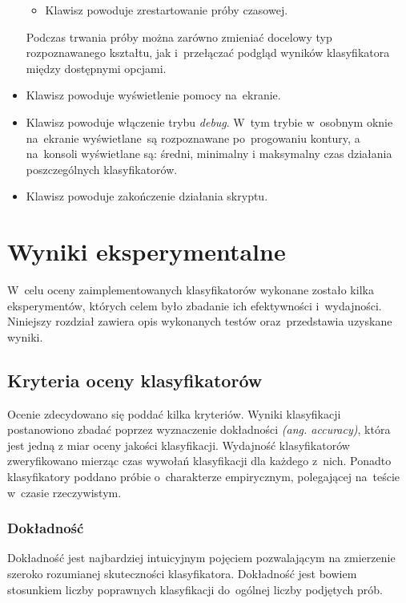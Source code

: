 \documentclass[11pt,a4paper]{article}
\begin{document}
\begin{itemize}
\begin{itemize}
        \item Klawisz  powoduje zrestartowanie próby czasowej.
    \end{itemize}
    Podczas trwania próby można zarówno zmieniać docelowy typ rozpoznawanego kształtu, jak i~przełączać podgląd wyników klasyfikatora między dostępnymi opcjami.
    \item Klawisz  powoduje wyświetlenie pomocy na~ekranie.
    \item Klawisz  powoduje włączenie trybu \emph{debug}.
    W~tym trybie w~osobnym oknie na~ekranie wyświetlane~są rozpoznawane po~progowaniu kontury, a na~konsoli wyświetlane są: średni, minimalny i maksymalny czas działania poszczególnych klasyfikatorów.
    \item Klawisz  powoduje zakończenie działania skryptu.
\end{itemize}

\section{Wyniki eksperymentalne}

W~celu oceny zaimplementowanych klasyfikatorów wykonane zostało kilka eksperymentów, których celem było zbadanie ich efektywności i~wydajności.
Niniejszy rozdział zawiera opis wykonanych testów oraz~przedstawia uzyskane wyniki.

\subsection{Kryteria oceny klasyfikatorów}

Ocenie zdecydowano się poddać kilka kryteriów. Wyniki klasyfikacji postanowiono zbadać poprzez wyznaczenie dokładności \emph{(ang. accuracy)}, która jest jedną z miar oceny jakości klasyfikacji. Wydajność klasyfikatorów zweryfikowano mierząc czas wywołań klasyfikacji dla każdego z~nich. Ponadto klasyfikatory poddano próbie o~charakterze empirycznym, polegającej na~teście w~czasie rzeczywistym. 

\subsubsection{Dokładność}

Dokładność jest najbardziej intuicyjnym pojęciem pozwalającym na zmierzenie szeroko rozumianej skuteczności klasyfikatora. Dokładność jest bowiem stosunkiem liczby poprawnych klasyfikacji do~ogólnej liczby podjętych prób.
\end{document}
